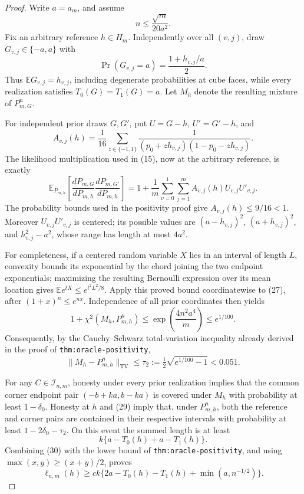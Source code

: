 \documentclass{article}
\begin{document}
\begin{proof}
Write \(a=a_m\), and assume
\[
 n\le\frac{\sqrt m}{20a^2}.                                               \tag{26}
\]
Fix an arbitrary reference \(h\in H_m\).  Independently over all
\((v,j)\), draw \(G_{v,j}\in\{-a,a\}\) with
\[
 \Pr(G_{v,j}=a)=\frac{1+h_{v,j}/a}{2}.
\]
Thus \(\mathbb EG_{v,j}=h_{v,j}\), including degenerate probabilities at
cube faces, while every realization satisfies \(T_0(G)=T_1(G)=a\).  Let
\(M_h\) denote the resulting mixture of \(P_{m,G}^n\).

For independent prior draws \(G,G'\), put \(U=G-h\), \(U'=G'-h\), and
\[
 A_{v,j}(h)=\frac1{16}\sum_{z\in\{-1,1\}}
 \frac1{(p_0+zh_{v,j})(1-p_0-zh_{v,j})}.
\]
The likelihood multiplication used in (15), now at the arbitrary reference,
is exactly
\[
 \mathbb E_{P_{m,h}}
 \left[\frac{dP_{m,G}}{dP_{m,h}}
       \frac{dP_{m,G'}}{dP_{m,h}}\right]
 =1+\frac1m\sum_{v=0}^1\sum_{j=1}^m
 A_{v,j}(h)U_{v,j}U'_{v,j}.                                               \tag{27}
\]
The probability bounds used in the positivity proof give
\(A_{v,j}(h)\le9/16<1\).  Moreover \(U_{v,j}U'_{v,j}\) is centered; its
possible values are \((a-h_{v,j})^2\), \((a+h_{v,j})^2\), and
\(h_{v,j}^2-a^2\), whose range has length at most \(4a^2\).

For completeness, if a centered random variable \(X\) lies in an interval
of length \(L\), convexity bounds its exponential by the chord joining the
two endpoint exponentials; maximizing the resulting Bernoulli expression
over its mean location gives
\(\mathbb Ee^{tX}\le e^{t^2L^2/8}\).  Apply this proved bound coordinatewise
to (27), after \((1+x)^n\le e^{nx}\).  Independence of all prior coordinates
then yields
\[
 1+\chi^2(M_h,P_{m,h}^n)
 \le\exp\left(\frac{4n^2a^4}{m}\right)\le e^{1/100}.                     \tag{28}
\]
Consequently, by the Cauchy--Schwarz total-variation inequality already
derived in the proof of \texttt{thm:oracle-positivity},
\[
 \|M_h-P_{m,h}^n\|_{\mathrm{TV}}
 \le\tau_2:=\tfrac12\sqrt{e^{1/100}-1}<0.051.                            \tag{29}
\]

For any \(C\in\mathcal I_{n,m}\), honesty under every prior realization
implies that the common corner endpoint pair \((-b+ka,b-ka)\) is covered
under \(M_h\) with probability at least \(1-\delta_0\).  Honesty at \(h\)
and (29) imply that, under \(P_{m,h}^n\), both the reference and corner pairs
are contained in their respective intervals with probability at least
\(1-2\delta_0-\tau_2\).  On this event the summed length is at least
\[
 k\{a-T_0(h)+a-T_1(h)\}.                                                  \tag{30}
\]
Combining (30) with the lower bound of
\texttt{thm:oracle-positivity}, and using
\(\max(x,y)\ge(x+y)/2\), proves
\[
 \ell_{n,m}(h)\ge
 ck\{2a-T_0(h)-T_1(h)+\min(a,n^{-1/2})\}.                                \tag{31}
\]


\end{proof}
\end{document}
